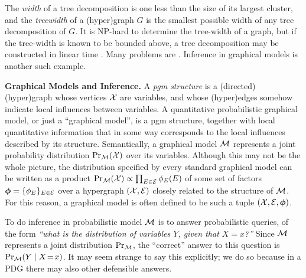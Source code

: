 \documentclass[twoside]{article}
\begin{document}
The \emph{width} of a tree decomposition is one less than the size of its largest cluster,
and the \emph{treewidth} of a (hyper)graph $G$ is the smallest possible width of any tree decomposition of $G$.
It is NP-hard to determine the tree-width of a graph, but if the tree-width is known to be bounded above, a tree decomposition may be constructed in linear time \parencite{bodlaender1993linear}.
Many problems are \parencite{courcelle1990}.
Inference in graphical models is another such example.


\textbf{Graphical Models and Inference.}
A \emph{pgm structure} is a (directed) (hyper)graph whose vertices $\mathcal X$ are variables, and whose (hyper)edges somehow indicate local influences between variables.
A {quantitative} probabilistic graphical model, or just a ``graphical model'', is a pgm structure, together with local quantitative information that in some way corresponds to the local influences described by its structure.
%
Semantically,
a graphical model $\cal M$
represents a joint probability distribution $\Pr_{\cal M}(\mathcal X)$ over its variables.
Although this may not be the whole picture, the distribution
specified by every standard graphical model can be written as a product
%
$\Pr_{\cal M}(\mathcal X) \propto \prod_{E \in \mathcal E} \phi_{E}(E)$
of some set of factors
$\boldsymbol\phi = \{ \phi_E \}_{E \in \mathcal E}$
over a hypergraph $(\mathcal X, \mathcal E)$ closely related to the structure of $\cal M$.
For this reason, a graphical model is often defined to be such a tuple
$(\mathcal X ,\mathcal E, \boldsymbol\phi)$.

To do inference in probabilistic model $\cal M$ is to answer probabilistic queries, of the form
\textit{``what is the distribution of variables $Y$, given that $X\!=\!x$?''}
%
Since $\cal M$ represents a joint distribution $\Pr_{\cal M}$,
the ``correct'' answer to this question is $\Pr_{\cal M}(Y \mid X\!=\!x)$.
It may seem strange to say this explicitly; we do so because
in a PDG there may also other defensible answers.
\end{document}

